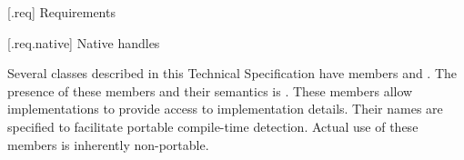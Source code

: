 [\iotwod.req] {Requirements}

 [\iotwod.req.native] {Native handles}

\pnum
Several classes described in this Technical Specification have members 
 and . The presence of these 
members and their semantics is .
\enternote
These members allow implementations to provide access to implementation 
details. Their names are specified to facilitate portable compile-time 
detection. Actual use of these members is inherently non-portable.
\exitnote
